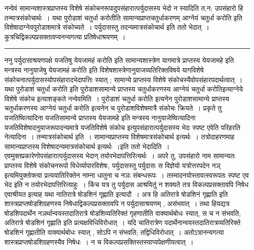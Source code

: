 \documentclass[11pt, openany]{book}
\begin{document}
{\bl नन्वेवं सामान्यशास्त्रप्राप्तस्य विशेषे संकोचनरूपादुपसंहारात्पर्युदासस्य भेदो न स्यादिति त,{\qtl  न}; उपसंहारो हि तन्मात्रसंकोचार्थः~। यथा पुरोडाशं चतुर्धा करोतीति सामान्यप्राप्तचतुर्धाकरणम् {\qtl आग्नेयं चतुर्धा करोति} इति विशेषादाग्नेयपुरोडाशमात्रे संकोच्यते~। पर्युदासस्तु तदन्यमात्रसंकोचार्थ इति ततो  भेदात्~। कुत्रचिद्विकल्पप्रसक्तावप्यनन्यगत्या प्रतिषेधाश्रयणम्~।}\\
\hrule
\vspace{3mm}

 {\br ननु} पर्युदासाश्रयणपक्षे {\qt यजतिषु येयजामहं करोति} इति सामान्यशास्त्रेण यागमात्रे प्राप्तस्य {\qt येयजामहे} इति मन्त्रस्य {\qt नानुयाजेषु येयजामहं करोति}  इति विशेषशास्त्रेणानुयाजव्यतिरिक्तविषये यागविशेषे संकोचनात्पर्युदासस्योपसंहारादभेदापत्तिः स्यात् ; सामान्ये प्राप्तस्य विशेषे संकोचस्यैवोपसंहारपदार्थत्वात्~। यथा {\qt पुरोडाशं चतुर्धा करोति} इति पुरोडाशसामान्ये प्राप्तस्य चतुर्धाकरणस्य आग्नेयं चतुर्धा करोतिइत्याग्नेये विशेषे संकोच इत्याशङ्कते {\br नन्वेवमिति~।} 
{\qt पुरोडाशं चतुर्धा करोति}  इत्यनेन पुरोडाशसामान्ये प्राप्तस्य चतुर्धाकरणस्य  {\qt आग्नेयं चतुर्धा करोति}  इत्यनेन च पुरोडाशविशेषमात्रै संकोचः क्रियते~। प्रकृते तु यजतिष्वित्यादिना यजतिसामान्ये प्राप्तस्य {\qt येयजामहे} इति मन्त्रस्य  नानुयाजेष्वित्यादिना यजतिविशेषादनुयाजरूपादन्यमात्रे यजतिविशेषे संकोच  इत्युपसंहारात्पर्युदासस्य भेदः स्पष्ट एवेति परिहरति {\br नेत्यादिना~। तन्मात्रसंकोचार्थ इति~।} सामान्यप्राप्तस्य विशेषमात्रसंकोचार्थ इत्यर्थः~। तत्रोदाहरणमाह सामान्यप्राप्तस्य विशेषादन्यमात्रसंकोचार्थ इत्यर्थः~।{\br इति ततो भेदादिति~।} एवमुक्तप्रकारेणोपसंहारात्पर्युदासस्य भेदान् तयोरभेदापत्तिरित्यर्थः~। अपरे तु, उपसंहारो  नाम सामान्यतः प्राप्तस्य विशेषे संकोचनरूपो विधेर्व्यापारविशेषः, पर्युदासस्तु {\qt पर्युदासः स विज्ञेयो यत्रोत्तरपदेन नञ्} इत्यमियुक्तोक्त्या प्रत्ययातिरिक्तेन नाम्ना धातुना च नञः संबन्धरूपः~। तस्मादनयोस्तावत्स्वरूपतः स्पष्ट एव भेद इति न तयोरभेदापत्तिरित्याहुः~। किंच यत्र तु पर्युदास आश्रयितुं न शक्यते तत्र विकल्पप्रसक्तावपि निषेध एवाश्रीयत इत्याह 
\newpage
{\bl\noindent
यथा {\qtl नातिरात्रे षोडशिनं गृह्णाति} इत्यादौ~। अत्र हि {\qtl अतिरात्रे  षोडशिनं गृह्णाति} इति शास्त्रप्राप्तषोडशिग्रहणस्य निषेधाद्विकल्पप्रसक्तावपि न पर्युदासाश्रयणम् , असंभवात्~। तथा हि\textendash यद्यत्र  षोडशिपदार्थेन नञर्थान्वयस्तदातिरात्रे षोडशिव्यतिरिक्तं गृहणातीति वाक्यार्थबोधः स्यात्, स च न संभवति, {\qtl अतिरात्रे षोडशिनं गृह्णाति}  इति प्रत्यक्षविधिविरोधात्~। यदि चातिरात्रेण  पदार्थेनान्वयस्तदातिरात्रव्यतिरिक्ते षोडशिनं गृह्णातीति वाक्यार्थबोधः स्यात् , सोऽपि न संभवति; तद्विधिविरोधात्~। अतोऽत्रानन्यगत्या शास्त्रप्राप्तषोडशिग्रहणस्यैव निषेधः~। न च विकल्पप्रसक्तिस्तस्याप्यपेक्षणीयत्वात्~।}\\
\end{document}
